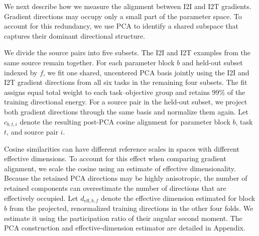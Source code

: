 
We next describe how we measure the alignment between I2I and I2T gradients. Gradient directions may occupy only a small part of the parameter space. To account for this redundancy, we use PCA to identify a shared subspace that captures their dominant directional structure. 

We divide the source pairs into five subsets.
The I2I and I2T examples from the same source remain together. For each parameter block $b$ and held-out subset indexed by $f$, we fit one shared, uncentered PCA basis jointly using the I2I
and I2T gradient directions from all six tasks in the remaining four subsets.
The fit assigns equal total weight to each task--objective group and retains 99\% of the training directional energy. For a source pair in the held-out subset, we project both gradient directions through the same basis and normalize them again. Let $c_{b,t,i}$ denote the resulting post-PCA cosine alignment for parameter block $b$, task $t$, and source pair $i$.

Cosine similarities can have different reference scales in spaces with different effective dimensions. To account for this effect when comparing gradient alignment, we scale the cosine using an estimate of effective dimensionality.
Because the retained PCA directions may be highly anisotropic, the number of retained components can overestimate the number of directions that are effectively occupied. Let $d_{\mathrm{eff},b,f}$ denote the effective  dimension estimated for block $b$ from the projected, renormalized training directions
in the other four folds. We estimate it using the participation ratio of their angular second moment. The PCA construction and effective-dimension estimator are detailed in Appendix.


